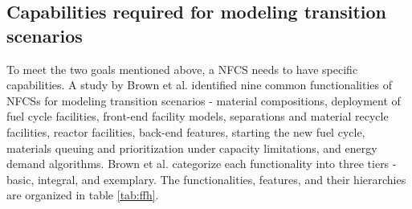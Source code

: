 \subsection{Capabilities required for modeling transition scenarios}
To meet the two goals mentioned above, a \gls{NFCS} needs to have
specific capabilities.
A study by Brown et al. \cite{brown_identification_2016}
identified nine common functionalities of \glspl{NFCS} for modeling
transition scenarios - material compositions, deployment of fuel
cycle facilities, front-end facility models, separations and material
recycle facilities, reactor facilities, back-end features, starting
the new fuel cycle, materials queuing and prioritization under
capacity limitations, and energy demand algorithms. Brown et al.
categorize each functionality into three tiers - basic, integral,
and exemplary. The functionalities, features, and their hierarchies
are organized in table \ref{tab:ffh}.


